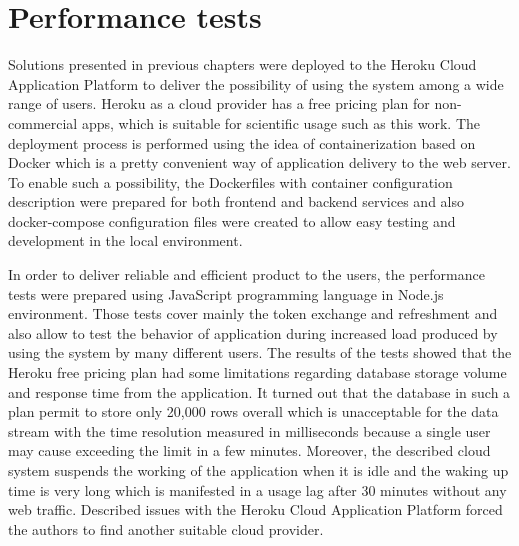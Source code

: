 \section{Performance tests}\label{sec:performance-tests}
Solutions presented in previous chapters were deployed to the Heroku Cloud Application Platform to deliver the possibility of using the system among a wide range of users.
Heroku as a cloud provider has a free pricing plan for non-commercial apps, which is suitable for scientific usage such as this work.
The deployment process is performed using the idea of containerization based on Docker which is a pretty convenient way of application delivery to the web server.
To enable such a possibility, the \mbox{Dockerfiles} with container configuration description were prepared for both frontend and backend services and also docker-compose configuration files were created to allow easy testing and development in the local environment.

In order to deliver reliable and efficient product to the users, the performance tests were prepared using JavaScript programming language in Node.js environment.
Those tests cover mainly the token exchange and refreshment and also allow to test the behavior of application during increased load produced by using the system by many different users.
The results of the tests showed that the Heroku free pricing plan had some limitations regarding database storage volume and response time from the application.
It turned out that the database in such a plan permit to store only 20,000 rows overall which is unacceptable for the data stream with the time resolution measured in milliseconds because a single user may cause exceeding the limit in a few minutes.
Moreover, the described cloud system suspends the working of the application when it is idle and the waking up time is very long which is manifested in a usage lag after 30 minutes without any web traffic.
Described issues with the Heroku Cloud Application Platform forced the authors to find another suitable cloud provider.
